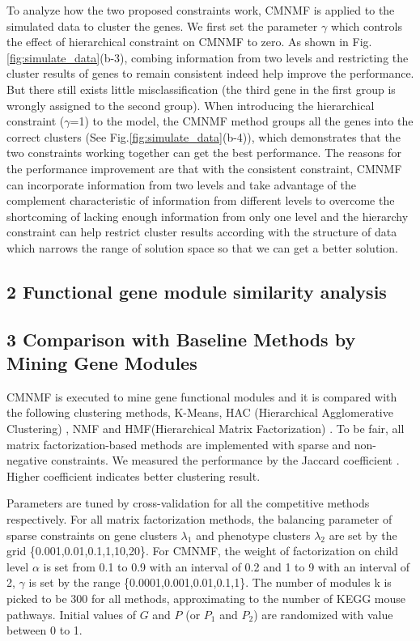 \documentclass{bmcart}
\begin{document}
To analyze how the two proposed constraints work, CMNMF is applied to the simulated data to cluster the genes. We first set the parameter $\gamma$ which controls the effect of hierarchical constraint on CMNMF to zero. As shown in Fig.\ref{fig:simulate_data}(b-3), combing information from two levels and restricting the cluster results of genes to remain consistent indeed help improve the performance. But there still exists little misclassification (the third gene in the first group is wrongly assigned to the second group). When introducing the hierarchical constraint ($\gamma$=1) to the model, the CMNMF method groups all the genes into the correct clusters (See Fig.\ref{fig:simulate_data}(b-4)), which demonstrates that the two constraints working together can get the best performance. The reasons for the performance improvement are that with the consistent constraint, CMNMF can incorporate information from two levels and take advantage of the complement characteristic of information from different levels to overcome the shortcoming of lacking enough information from only one level and the hierarchy constraint can help restrict cluster results according with the structure of data which narrows the range of solution space so that we can get a better solution.

\subsection*{2 Functional gene module similarity analysis}

\subsection*{3 Comparison with Baseline Methods by Mining Gene Modules}
CMNMF is executed to mine gene functional modules and it is compared with the following clustering methods, K-Means, HAC (Hierarchical Agglomerative Clustering) \cite{HAC}, NMF and HMF(Hierarchical Matrix Factorization) \cite{HMF}. To be fair, all matrix factorization-based methods are implemented with sparse and non-negative constraints. We measured the performance by the Jaccard coefficient \cite{cluster_survey}. Higher coefficient indicates better clustering result.

Parameters are tuned by cross-validation for all the competitive methods respectively. For all matrix factorization methods, the balancing parameter of sparse constraints on gene clusters $\lambda_1$ and phenotype clusters $\lambda_2$ are set by the grid \{0.001,0.01,0.1,1,10,20\}. For CMNMF, the weight of factorization on child level $\alpha$ is set from 0.1 to 0.9 with an interval of 0.2 and 1 to 9 with an interval of 2, $\gamma$ is set by the range \{0.0001,0.001,0.01,0.1,1\}. The number of modules k is picked to be 300 for all methods, approximating to the number of KEGG mouse pathways. Initial values of $G$ and $P$ (or $P_1$ and $P_2$) are randomized with value between 0 to 1.
\end{document}
